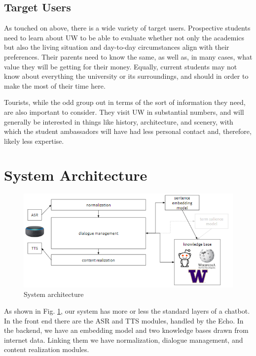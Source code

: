 \documentclass[11pt]{article}
\begin{document}
\subsection{Target Users}

As touched on above, there is a wide variety of target users. Prospective students need to learn about UW to be able to evaluate whether not only the academics but also the living situation and day-to-day circumstances align with their preferences. Their parents need to know the same, as well as, in many cases, what value they will be getting for their money. Equally, current students may not know about everything the university or its surroundings, and should in order to make the most of their time here.

Tourists, while the odd group out in terms of the sort of information they need, are also important to consider. They visit UW in substantial numbers, and will generally be interested in things like history, architecture, and scenery, with which the student ambassadors will have had less personal contact and, therefore, likely less expertise.

\section{System Architecture}

\begin{figure}
	\includegraphics[width=\textwidth]{architecture.png}
	\caption{System architecture}
	\label{fig:architecture}
\end{figure}

As shown in Fig. \ref{fig:architecture}, our system has more or less the standard layers of a chatbot. In the front end there are the ASR and TTS modules, handled by the Echo. In the backend, we have an embedding model and two knowledge bases drawn from internet data. Linking them we have normalization, dialogue management, and content realization modules.
\end{document}
